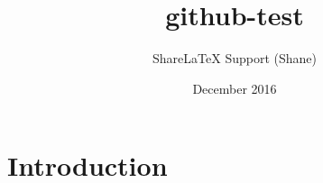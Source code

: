\documentclass{article}
\title{github-test}
\author{ShareLaTeX Support (Shane)}
\date{December 2016}
\begin{document}
\maketitle

\section{Introduction}
\end{document}
